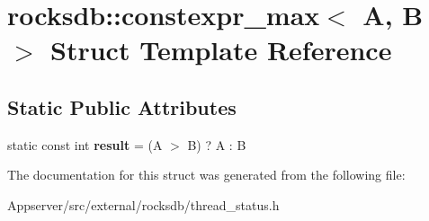 \hypertarget{structrocksdb_1_1constexpr__max}{}\section{rocksdb\+:\+:constexpr\+\_\+max$<$ A, B $>$ Struct Template Reference}
\label{structrocksdb_1_1constexpr__max}
\subsection*{Static Public Attributes}
\begin{DoxyCompactItemize}
\item 
static const int {\bfseries result} = (A $>$ B) ? A \+: B\hypertarget{structrocksdb_1_1constexpr__max_a4571625a88692dc2b8fbf82ef96830e3}{}\label{structrocksdb_1_1constexpr__max_a4571625a88692dc2b8fbf82ef96830e3}

\end{DoxyCompactItemize}


The documentation for this struct was generated from the following file\+:\begin{DoxyCompactItemize}
\item 
Appserver/src/external/rocksdb/thread\+\_\+status.\+h\end{DoxyCompactItemize}
